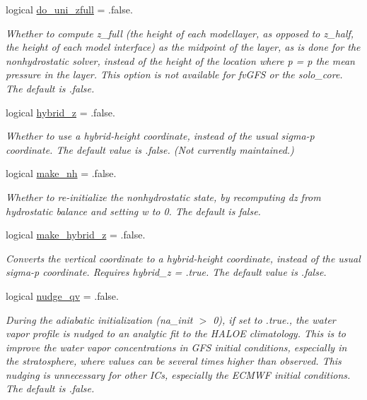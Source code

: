 \begin{DoxyCompactItemize}
logical \hyperlink{structfv__arrays__mod_1_1fv__flags__type_a0659d7f4aeb76e04aa09f877e976fe48}{do\-\_\-uni\-\_\-zfull} = .false.
\begin{DoxyCompactList}\small\item\em Whether to compute z\-\_\-full (the height of each modellayer, as opposed to z\-\_\-half, the height of each model interface) as the midpoint of the layer, as is done for the nonhydrostatic solver, instead of the height of the location where p = p the mean pressure in the layer. This option is not available for fv\-G\-F\-S or the solo\-\_\-core. The default is .false. \end{DoxyCompactList}\item 
logical \hyperlink{structfv__arrays__mod_1_1fv__flags__type_aaa7ad25f7078c86a27efa0fd14977092}{hybrid\-\_\-z} = .false.
\begin{DoxyCompactList}\small\item\em Whether to use a hybrid-\/height coordinate, instead of the usual sigma-\/p coordinate. The default value is .false. (Not currently maintained.) \end{DoxyCompactList}\item 
logical \hyperlink{structfv__arrays__mod_1_1fv__flags__type_af9e0c974a9870aa7032b2a9b96b42793}{make\-\_\-nh} = .false.
\begin{DoxyCompactList}\small\item\em Whether to re-\/initialize the nonhydrostatic state, by recomputing dz from hydrostatic balance and setting w to 0. The default is false. \end{DoxyCompactList}\item 
logical \hyperlink{structfv__arrays__mod_1_1fv__flags__type_a954890d920a3c7ec31803a505c4d93d0}{make\-\_\-hybrid\-\_\-z} = .false.
\begin{DoxyCompactList}\small\item\em Converts the vertical coordinate to a hybrid-\/height coordinate, instead of the usual sigma-\/p coordinate. Requires hybrid\-\_\-z = .true. The default value is .false. \end{DoxyCompactList}\item 
logical \hyperlink{structfv__arrays__mod_1_1fv__flags__type_ac47cf9a2852553a0d3b1980b8b886774}{nudge\-\_\-qv} = .false.
\begin{DoxyCompactList}\small\item\em During the adiabatic initialization (na\-\_\-init $>$ 0), if set to .true., the water vapor profile is nudged to an analytic fit to the H\-A\-L\-O\-E climatology. This is to improve the water vapor concentrations in G\-F\-S initial conditions, especially in the stratosphere, where values can be several times higher than observed. This nudging is unnecessary for other I\-Cs, especially the E\-C\-M\-W\-F initial conditions. The default is .false. \end{DoxyCompactList}\item 

\end{DoxyCompactItemize}
